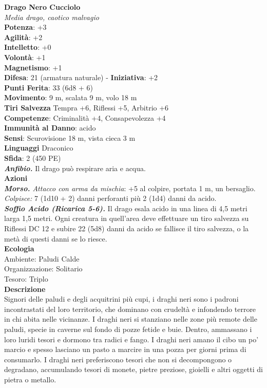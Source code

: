 \begin{multicols}{2}
\medskip\textbf{Drago Nero Cucciolo}\\
\emph{Media drago, caotico malvagio}\\
\textbf{Potenza}: +3\\
\textbf{Agilità}: +2\\
\textbf{Intelletto}: +0\\
\textbf{Volontà}: +1\\
\textbf{Magnetismo}: +1\\
\textbf{Difesa}: 21 (armatura naturale) - \textbf{Iniziativa}: +2\\
\textbf{Punti Ferita}: 33 (6d8 + 6)\\
\textbf{Movimento}: 9 m, scalata 9 m, volo 18 m\\
\textbf{Tiri Salvezza} Tempra +6, Riflessi +5, Arbitrio +6\\
\textbf{Competenze}: Criminalità +4, Consapevolezza +4\\
\textbf{Immunità al Danno}: acido\\
\textbf{Sensi}: Scurovisione 18 m, vista cieca 3 m\\
\textbf{Linguaggi} Draconico\\
\textbf{Sfida}: 2 (450 PE)\smallskip\\
\emph{\textbf{Anfibio.}} Il drago può respirare aria e acqua.\\
\smallskip\textbf{Azioni}\\
\emph{\textbf{Morso.} Attacco con arma da mischia}: +5 al colpire, portata 1 m, un bersaglio.\\
\emph{Colpisce:} 7 (1d10 + 2) danni perforanti più 2 (1d4) danni da acido.\\
\emph{\textbf{Soffio Acido (Ricarica 5-6).}} Il drago esala acido in una linea di 4,5 metri larga 1,5 metri. Ogni creatura in quell'area deve effettuare un tiro salvezza su Riflessi DC  12 e subire 22 (5d8) danni da acido se fallisce il tiro salvezza, o la metà di questi danni se lo riesce.\\
\textbf{Ecologia}\\
Ambiente: Paludi Calde\\
Organizzazione: Solitario\\
Tesoro: Triplo\\
\textbf{Descrizione}\\
Signori delle paludi e degli acquitrini più cupi, i draghi neri sono i padroni incontrastati del loro territorio, che dominano con crudeltà e infondendo terrore in chi abita nelle vicinanze. I draghi neri si stanziano nelle zone più remote delle paludi, specie in caverne sul fondo di pozze fetide e buie. Dentro, ammassano i loro luridi tesori e dormono tra radici e fango. I draghi neri amano il cibo un po’ marcio e spesso lasciano un pasto a marcire in una pozza per giorni prima di consumarlo. I draghi neri preferiscono tesori che non si decompongono o degradano, accumulando tesori di monete, pietre preziose, gioielli e altri oggetti di pietra o metallo.\\


\end{multicols}
